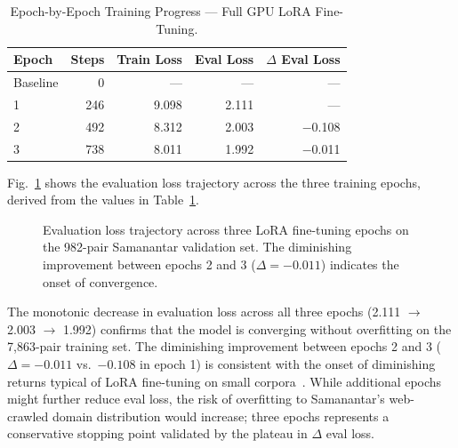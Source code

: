 \documentclass[conference]{IEEEtran}
\begin{document}
\begin{table}[htbp]
\caption{Epoch-by-Epoch Training Progress --- Full GPU LoRA Fine-Tuning.}
\label{tab:epoch_progress}
\centering
\begin{tabular}{lrrrr}
\toprule
Epoch & Steps & Train Loss & Eval Loss & $\Delta$ Eval Loss \\
\midrule
Baseline & 0   & ---    & ---   & --- \\
1        & 246 & 9.098  & 2.111 & --- \\
2        & 492 & 8.312  & 2.003 & $-$0.108 \\
3        & 738 & 8.011  & 1.992 & $-$0.011 \\
\bottomrule
\end{tabular}
\end{table}

Fig.~\ref{fig:bleu_progression} shows the evaluation loss trajectory across the three
training epochs, derived from the values in Table~\ref{tab:epoch_progress}.

\begin{figure}[htbp]
\centering
{}
\caption{Evaluation loss trajectory across three LoRA fine-tuning epochs on the
         982-pair Samanantar validation set. The diminishing improvement between
         epochs 2 and 3 ($\Delta = -0.011$) indicates the onset of convergence.}
\label{fig:bleu_progression}
\end{figure}

The monotonic decrease in evaluation loss across all three epochs (2.111 $\to$ 2.003
$\to$ 1.992) confirms that the model is converging without overfitting on the
7,863-pair training set.
The diminishing improvement between epochs 2 and 3 ($\Delta = -0.011$ vs.\
$-0.108$ in epoch 1) is consistent with the onset of diminishing returns typical
of LoRA fine-tuning on small corpora~\cite{hu2021lora}.
While additional epochs might further reduce eval loss, the risk of overfitting to
Samanantar's web-crawled domain distribution would increase; three epochs represents
a conservative stopping point validated by the plateau in $\Delta$ eval loss.
\end{document}
